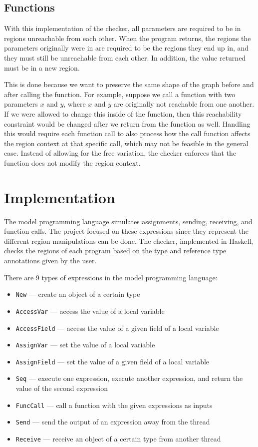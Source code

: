 \documentclass{article}
\begin{document}
  \subsection{Functions}

  With this implementation of the checker,
    all parameters are required to be in regions unreachable from each other.
  When the program returns,
    the regions the parameters originally were in are required to be the regions
    they end up in,
    and they must still be unreachable from each other.
  In addition,
    the value returned must be in a new region.

  This is done because we want to preserve the same shape of the graph
    before and after calling the function.
  For example,
    suppose we call a function with two parameters $x$ and $y$,
    where $x$ and $y$ are originally not reachable from one another.
  If we were allowed to change this inside of the function,
    then this reachability constraint would be changed after we return from the function as well.
  Handling this would require each function call to also process how the call function affects
    the region context at that specific call,
    which may not be feasible in the general case.
  Instead of allowing for the free variation,
    the checker enforces that the function does not modify the region context.

  \section{Implementation}

  The model programming language simulates assignments, sending, receiving, and function calls.
  The project focused on these expressions
    since they represent the different region manipulations can be done.
  The checker,
    implemented in Haskell,
    checks the regions of each program
    based on the type and reference type annotations given by the user.

  There are 9 types of expressions in the model programming language:
  \begin{itemize}
    \item \verb+New+ --- create an object of a certain type
    \item \verb+AccessVar+ --- access the value of a local variable
    \item \verb+AccessField+ --- access the value of a given field of a local variable
    \item \verb+AssignVar+ --- set the value of a local variable
    \item \verb+AssignField+ --- set the value of a given field of a local variable 
    \item \verb+Seq+ --- execute one expression, execute another expression, 
      and return the value of the second expression
    \item \verb+FuncCall+ --- call a function with the given expressions as inputs
    \item \verb+Send+ --- send the output of an expression away from the thread
    \item \verb+Receive+ --- receive an object of a certain type from another thread
  \end{itemize}
\end{document}
